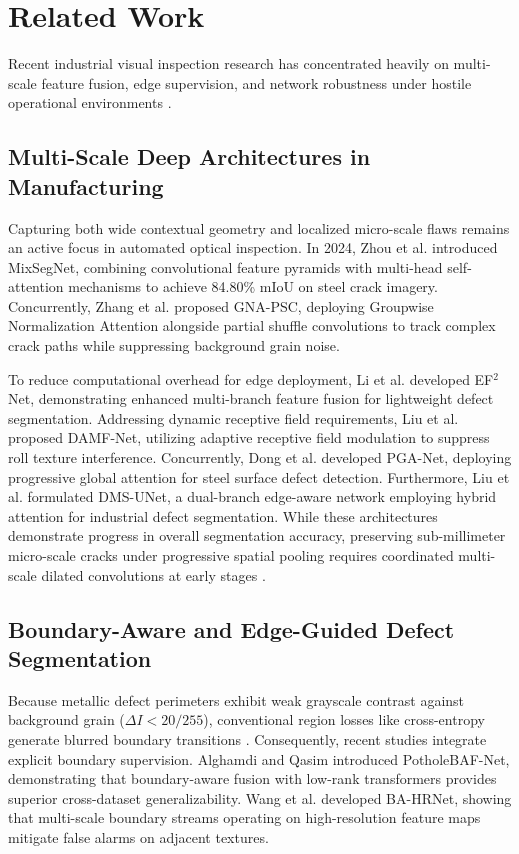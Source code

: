 \documentclass{ieeeaccess}
\begin{document}
\section{Related Work}
\label{sec:literature_review}
Recent industrial visual inspection research has concentrated heavily on multi-scale feature fusion, edge supervision, and network robustness under hostile operational environments \cite{survey2020, song2013neu}.

\subsection{Multi-Scale Deep Architectures in Manufacturing}
Capturing both wide contextual geometry and localized micro-scale flaws remains an active focus in automated optical inspection. In 2024, Zhou et al. \cite{zhou2024mixsegnet} introduced MixSegNet, combining convolutional feature pyramids with multi-head self-attention mechanisms to achieve 84.80\% mIoU on steel crack imagery. Concurrently, Zhang et al. \cite{zhang2024gnapsc} proposed GNA-PSC, deploying Groupwise Normalization Attention alongside partial shuffle convolutions to track complex crack paths while suppressing background grain noise.

To reduce computational overhead for edge deployment, Li et al. \cite{li2024ef2net} developed EF$^2$Net, demonstrating enhanced multi-branch feature fusion for lightweight defect segmentation. Addressing dynamic receptive field requirements, Liu et al. \cite{liu2024damfnet} proposed DAMF-Net, utilizing adaptive receptive field modulation to suppress roll texture interference. Concurrently, Dong et al. \cite{dong2023pganet} developed PGA-Net, deploying progressive global attention for steel surface defect detection. Furthermore, Liu et al. \cite{liu2026dmsunet} formulated DMS-UNet, a dual-branch edge-aware network employing hybrid attention for industrial defect segmentation. While these architectures demonstrate progress in overall segmentation accuracy, preserving sub-millimeter micro-scale cracks under progressive spatial pooling requires coordinated multi-scale dilated convolutions at early stages \cite{chen2018deeplabv3plus}.

\subsection{Boundary-Aware and Edge-Guided Defect Segmentation}
Because metallic defect perimeters exhibit weak grayscale contrast against background grain ($\Delta I < 20/255$), conventional region losses like cross-entropy generate blurred boundary transitions \cite{krassnig2025ispad, alghamdi2024potholebaf}. Consequently, recent studies integrate explicit boundary supervision. Alghamdi and Qasim \cite{alghamdi2024potholebaf} introduced PotholeBAF-Net, demonstrating that boundary-aware fusion with low-rank transformers provides superior cross-dataset generalizability. Wang et al. \cite{wang2025bahrnet} developed BA-HRNet, showing that multi-scale boundary streams operating on high-resolution feature maps mitigate false alarms on adjacent textures.
\end{document}
